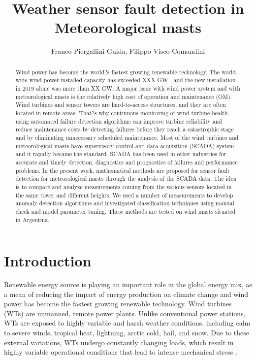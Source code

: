 \documentclass[journal]{IEEEtran}
\begin{document}
\title{Weather sensor fault detection in Meteorological masts}

\author{Franco Piergallini Guida, Filippo Visco-Comandini}
\maketitle

\begin{abstract}
Wind power has become the world?s fastest growing renewable technology. The world-wide wind power installed capacity has exceeded XXX GW , and the new installation in 2019 alone was more than XX GW. A major issue with wind power system and with meteorological masts is the relatively high cost of operation and maintenance (OM). Wind turbines and sensor towers are hard-to-access structures, and they are often located in remote areas. That?s why continuous monitoring of wind turbine health using automated failure detection algorithms can improve turbine reliability and reduce maintenance costs by detecting failures before they reach a catastrophic stage and by eliminating unnecessary scheduled maintenance.
Most of the wind turbines and meteorological masts have supervisory control and data acquisition (SCADA) system and it rapidly became the standard. SCADA has been used in other industries for accurate and timely detection, diagnostics and prognostics of failures and performance problems.
In the present work, mathematical methods are proposed for sensor fault detection for meteorological masts through the analysis of the SCADA data. The idea is to compare and analyze measurements coming from the various sensors located in the same tower and different heights. We used a number of measurements to develop anomaly detection algorithms and investigated classification techniques using manual check and model parameter tuning. 
These methods are tested on wind masts situated in Argentina.
\end{abstract}
\section{Introduction}
Renewable energy source is playing an important role in the global energy mix, as a mean of reducing the impact of energy production on climate change and wind power has become the fastest growing renewable technology. 
Wind turbines (WTs) are unmanned, remote power plants. Unlike conventional power stations, WTs are exposed to highly variable and harsh weather conditions, including calm to severe winds, tropical heat, lightning, arctic cold, hail, and snow. Due to these external variations, WTs undergo constantly changing loads, which result in highly variable operational conditions that lead to intense mechanical stress \cite{ribrant2006thesis}.
\end{document}
